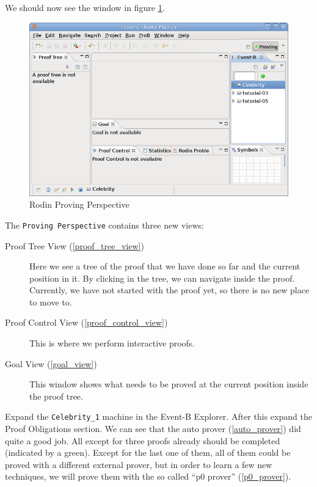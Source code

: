 We should now see the window in figure \ref{fig_tut_08_proving_perspective}. 

\begin{figure}[!h]
\begin{center}
	\includegraphics{img/tutorial/tut_08_proving_perspective.png}
	\caption{Rodin Proving Perspective}
	\label{fig_tut_08_proving_perspective}
\end{center}
\end{figure}

The \texttt{Proving Perspective} contains three new views:

\begin{description}
	\item[Proof Tree View (\ref{proof_tree_view})] Here we see a tree of the proof that we have done so far and the current position in it. By clicking in the tree, we can navigate inside the proof. Currently, we have not started with the proof yet, so there is no new place to move to. 
	\item[Proof Control View (\ref{proof_control_view})] This is where we perform interactive proofs.
	\item[Goal View (\ref{goal_view})] This window shows what needs to be proved at the current position inside the proof tree.
\end{description}

Expand the \texttt{Celebrity\_1} machine in the Event-B Explorer. After this expand the Proof Obligations section. We can see that the auto prover (\ref{auto_prover}) did quite a good job. All except for three proofs already should be completed (indicated by a green). Except for the last one of them, all of them could be proved with a different external prover, but in order to learn a few new techniques, we will prove them with the so called ``p0 prover'' (\ref{p0_prover}).

